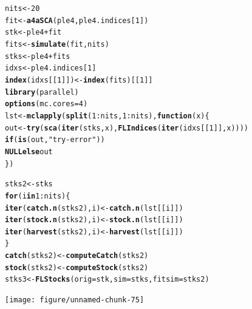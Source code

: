 \documentclass[a4paper,english,10pt]{article}\usepackage[]{graphicx}\usepackage[]{color}
\makeatletter
\newcommand{\hlnum}[1]{\textcolor[rgb]{0.686,0.059,0.569}{#1}}%
\newcommand{\hlstr}[1]{\textcolor[rgb]{0.192,0.494,0.8}{#1}}%
\newcommand{\hlopt}[1]{\textcolor[rgb]{0,0,0}{#1}}%
\newcommand{\hlstd}[1]{\textcolor[rgb]{0.345,0.345,0.345}{#1}}%
\newcommand{\hlkwa}[1]{\textcolor[rgb]{0.161,0.373,0.58}{\textbf{#1}}}%
\newcommand{\hlkwb}[1]{\textcolor[rgb]{0.69,0.353,0.396}{#1}}%
\newcommand{\hlkwc}[1]{\textcolor[rgb]{0.333,0.667,0.333}{#1}}%
\newcommand{\hlkwd}[1]{\textcolor[rgb]{0.737,0.353,0.396}{\textbf{#1}}}%
\newenvironment{kframe}{%
 \def\at@end@of@kframe{}%
 \ifinner\ifhmode%
  \def\at@end@of@kframe{\end{minipage}}%
  \begin{minipage}{\columnwidth}%
 \fi\fi%
 \def\FrameCommand##1{\hskip\@totalleftmargin \hskip-\fboxsep
 \colorbox{shadecolor}{##1}\hskip-\fboxsep
     \hskip-\linewidth \hskip-\@totalleftmargin \hskip\columnwidth}%
 \MakeFramed {\advance\hsize-\width
   \@totalleftmargin\z@ \linewidth\hsize
   \@setminipage}}%
 {\par\unskip\endMakeFramed%
 \at@end@of@kframe}
\newenvironment{knitrout}{}{} %
\makeatother
\begin{document}
\begin{knitrout}
\color{fgcolor}\begin{kframe}
\begin{alltt}
\hlstd{nits} \hlkwb{<-} \hlnum{20}
\hlstd{fit} \hlkwb{<-} \hlkwd{a4aSCA}\hlstd{(ple4, ple4.indices[}\hlnum{1}\hlstd{])}
\hlstd{stk} \hlkwb{<-} \hlstd{ple4} \hlopt{+} \hlstd{fit}
\hlstd{fits} \hlkwb{<-} \hlkwd{simulate}\hlstd{(fit, nits)}
\hlstd{stks} \hlkwb{<-} \hlstd{ple4} \hlopt{+} \hlstd{fits}
\hlstd{idxs} \hlkwb{<-} \hlstd{ple4.indices[}\hlnum{1}\hlstd{]}
\hlkwd{index}\hlstd{(idxs[[}\hlnum{1}\hlstd{]])} \hlkwb{<-} \hlkwd{index}\hlstd{(fits)[[}\hlnum{1}\hlstd{]]}
\hlkwd{library}\hlstd{(parallel)}
\hlkwd{options}\hlstd{(}\hlkwc{mc.cores} \hlstd{=} \hlnum{4}\hlstd{)}
\hlstd{lst} \hlkwb{<-} \hlkwd{mclapply}\hlstd{(}\hlkwd{split}\hlstd{(}\hlnum{1}\hlopt{:}\hlstd{nits,} \hlnum{1}\hlopt{:}\hlstd{nits),} \hlkwa{function}\hlstd{(}\hlkwc{x}\hlstd{) \{}
    \hlstd{out} \hlkwb{<-} \hlkwd{try}\hlstd{(}\hlkwd{sca}\hlstd{(}\hlkwd{iter}\hlstd{(stks, x),} \hlkwd{FLIndices}\hlstd{(}\hlkwd{iter}\hlstd{(idxs[[}\hlnum{1}\hlstd{]], x))))}
    \hlkwa{if} \hlstd{(}\hlkwd{is}\hlstd{(out,} \hlstr{"try-error"}\hlstd{))}
        \hlkwa{NULL else} \hlstd{out}
\hlstd{\})}

\hlstd{stks2} \hlkwb{<-} \hlstd{stks}
\hlkwa{for} \hlstd{(i} \hlkwa{in} \hlnum{1}\hlopt{:}\hlstd{nits) \{}
    \hlkwd{iter}\hlstd{(}\hlkwd{catch.n}\hlstd{(stks2), i)} \hlkwb{<-} \hlkwd{catch.n}\hlstd{(lst[[i]])}
    \hlkwd{iter}\hlstd{(}\hlkwd{stock.n}\hlstd{(stks2), i)} \hlkwb{<-} \hlkwd{stock.n}\hlstd{(lst[[i]])}
    \hlkwd{iter}\hlstd{(}\hlkwd{harvest}\hlstd{(stks2), i)} \hlkwb{<-} \hlkwd{harvest}\hlstd{(lst[[i]])}
\hlstd{\}}
\hlkwd{catch}\hlstd{(stks2)} \hlkwb{<-} \hlkwd{computeCatch}\hlstd{(stks2)}
\hlkwd{stock}\hlstd{(stks2)} \hlkwb{<-} \hlkwd{computeStock}\hlstd{(stks2)}
\hlstd{stks3} \hlkwb{<-} \hlkwd{FLStocks}\hlstd{(}\hlkwc{orig} \hlstd{= stk,} \hlkwc{sim} \hlstd{= stks,} \hlkwc{fitsim} \hlstd{= stks2)}
\end{alltt}
\end{kframe}
\end{knitrout}


\begin{knitrout}
\color{fgcolor}

{\centering \texttt{[image: figure/unnamed-chunk-75]} 

}



\end{knitrout}
\end{document}
